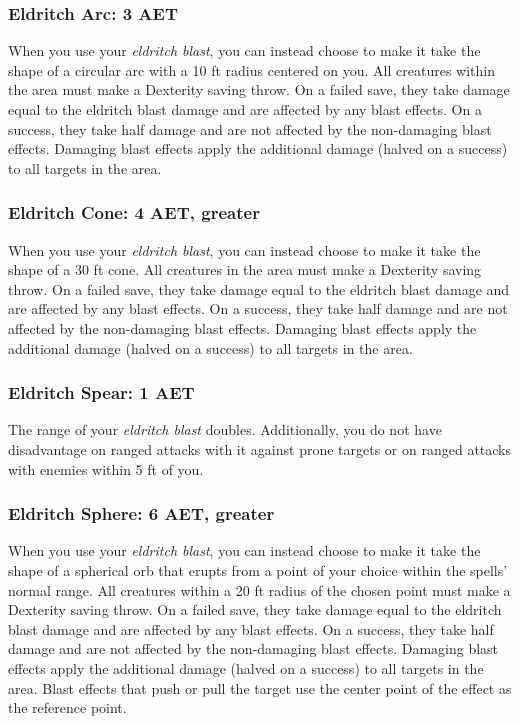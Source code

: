 \subsubsection{Eldritch Arc: 3 AET}
When you use your \textit{eldritch blast}, you can instead choose to make it take the shape of a circular arc with a 10 ft radius centered on you. All creatures within the area must make a Dexterity saving throw. On a failed save, they take damage equal to the eldritch blast damage and are affected by any blast effects. On a success, they take half damage and are not affected by the non-damaging blast effects. Damaging blast effects apply the additional damage (halved on a success) to all targets in the area.

\subsubsection{Eldritch Cone: 4 AET, greater}
When you use your \textit{eldritch blast}, you can instead choose to make it take the shape of a 30 ft cone. All creatures in the area must make a Dexterity saving throw. On a failed save, they take damage equal to the eldritch blast damage and are affected by any blast effects. On a success, they take half damage and are not affected by the non-damaging blast effects. Damaging blast effects apply the additional damage (halved on a success) to all targets in the area.

\subsubsection{Eldritch Spear: 1 AET}
The range of your \textit{eldritch blast} doubles. Additionally, you do not have disadvantage on ranged attacks with it against prone targets or on ranged attacks with enemies within 5 ft of you.

\subsubsection{Eldritch Sphere: 6 AET, greater}
When you use your \textit{eldritch blast}, you can instead choose to make it take the shape of a spherical orb that erupts from a point of your choice within the spells' normal range. All creatures within a 20 ft radius of the chosen point must make a Dexterity saving throw. On a failed save, they take damage equal to the eldritch blast damage and are affected by any blast effects. On a success, they take half damage and are not affected by the non-damaging blast effects. Damaging blast effects apply the additional damage (halved on a success) to all targets in the area. Blast effects that push or pull the target use the center point of the effect as the reference point.

